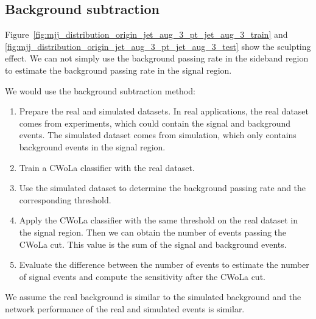 \documentclass[12pt]{article}
\begin{document}
    \subsection{Background subtraction}%
    \label{sub:background_subtraction}
        Figure~\ref{fig:mjj_distribution_origin_jet_aug_3_pt_jet_aug_3_train} and \ref{fig:mjj_distribution_origin_jet_aug_3_pt_jet_aug_3_test} show the sculpting effect. We can not simply use the background passing rate in the sideband region to estimate the background passing rate in the signal region.

        We would use the background subtraction method:
        \begin{enumerate}
            \item Prepare the real and simulated datasets. In real applications, the real dataset comes from experiments, which could contain the signal and background events. The simulated dataset comes from simulation, which only contains background events in the signal region.
            \item Train a CWoLa classifier with the real dataset.
            \item Use the simulated dataset to determine the background passing rate and the corresponding threshold.
            \item Apply the CWoLa classifier with the same threshold on the real dataset in the signal region. Then we can obtain the number of events passing the CWoLa cut. This value is the sum of the signal and background events.
            \item Evaluate the difference between the number of events to estimate the number of signal events and compute the sensitivity after the CWoLa cut.
        \end{enumerate}
        We assume the real background is similar to the simulated background and the network performance of the real and simulated events is similar. 
\end{document}
